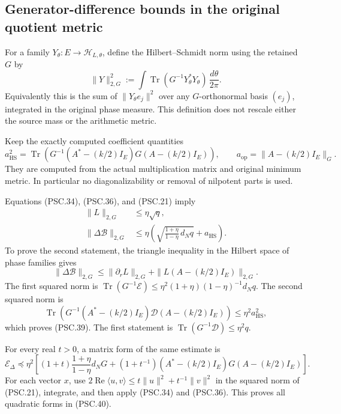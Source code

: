 \subsection{Generator-difference bounds in the original quotient metric}

For a family \(Y_\theta:E\to\mathcal H_{L,\theta}\), define the Hilbert–Schmidt norm using the retained \(G\) by
\[
 \|Y\|_{2,G}^2
 :=\int\operatorname{Tr}(G^{-1}Y_\theta^*Y_\theta)
                  \,\frac{d\theta}{2\pi}.
 \tag{PSC.37}
\]
Equivalently this is the sum of \(\|Y_\theta e_j\|^2\) over any \(G\)-orthonormal basis \((e_j)\), integrated in the original phase measure. This definition does not rescale either the source mass or the arithmetic metric.

Keep the exactly computed coefficient quantities
\[
 a_{\mathrm{HS}}^2
 =\operatorname{Tr}\!\left(
       G^{-1}(A^*-(k/2)I_E)G(A-(k/2)I_E)\right),\qquad
 a_{\mathrm{op}}=\|A-(k/2)I_E\|_G.
 \tag{PSC.38}
\]
They are computed from the actual multiplication matrix and original minimum metric. In particular no diagonalizability or removal of nilpotent parts is used.

Equations (PSC.34), (PSC.36), and (PSC.21) imply
\[
 \boxed{
 \begin{aligned}
 \|L\|_{2,G}&\leq\eta\sqrt q,\\
 \|\Delta\mathscr B\|_{2,G}
 &\leq\eta\left(
     \sqrt{\frac{1+\eta}{1-\eta}\,d_Nq}
     +a_{\mathrm{HS}}\right).
 \end{aligned}}
 \tag{PSC.39}
\]
To prove the second statement, the triangle inequality in the Hilbert space of phase families gives
\[
 \|\Delta\mathscr B\|_{2,G}
 \leq\|\partial_rL\|_{2,G}
      +\|L(A-(k/2)I_E)\|_{2,G}.
 \]
The first squared norm is
\(\operatorname{Tr}(G^{-1}\mathscr E)
\leq\eta^2(1+\eta)(1-\eta)^{-1}d_Nq\).
The second squared norm is
\[
 \operatorname{Tr}\!\left(
 G^{-1}(A^*-(k/2)I_E)\mathscr D(A-(k/2)I_E)\right)
 \leq\eta^2a_{\mathrm{HS}}^2,
 \]
which proves (PSC.39). The first statement is
\(\operatorname{Tr}(G^{-1}\mathscr D)\leq\eta^2q\).

For every real \(t>0\), a matrix form of the same estimate is
\[
 \mathscr E_\Delta
 \preceq\eta^2\left[
   (1+t)\frac{1+\eta}{1-\eta}d_NG
   +(1+t^{-1})(A^*-(k/2)I_E)G(A-(k/2)I_E)
 \right].
 \tag{PSC.40}
\]
For each vector \(x\), use
\(2\operatorname{Re}\langle u,v\rangle
\leq t\|u\|^2+t^{-1}\|v\|^2\)
in the squared norm of (PSC.21), integrate, and then apply (PSC.34) and (PSC.36). This proves all quadratic forms in (PSC.40).

